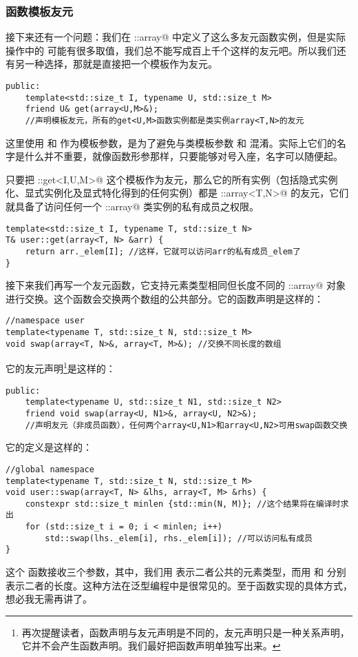 \subsubsection*{函数模板友元}
接下来还有一个问题：我们在 \lstinline@user::array@ 中定义了这么多友元函数实例，但是实际操作中的 \lstinline@I@ 可能有很多取值，我们总不能写成百上千个这样的友元吧。所以我们还有另一种选择，那就是直接把一个模板作为友元。
\begin{lstlisting}
public:
    template<std::size_t I, typename U, std::size_t M>
    friend U& get(array<U,M>&);
    //声明模板友元，所有的get<U,M>函数实例都是类实例array<T,N>的友元
\end{lstlisting}
这里使用 \lstinline@U@ 和 \lstinline@M@ 作为模板参数，是为了避免与类模板参数 \lstinline@T@ 和 \lstinline@N@ 混淆。实际上它们的名字是什么并不重要，就像函数形参那样，只要能够对号入座，名字可以随便起。\par
只要把 \lstinline@user::get<I,U,M>@ 这个模板作为友元，那么它的所有实例（包括隐式实例化、显式实例化及显式特化得到的任何实例）都是 \lstinline@user::array<T,N>@ 的友元，它们就具备了访问任何一个 \lstinline@user::array@ 类实例的私有成员之权限。
\begin{lstlisting}
template<std::size_t I, typename T, std::size_t N>
T& user::get(array<T, N> &arr) {
    return arr._elem[I]; //这样，它就可以访问arr的私有成员_elem了
}
\end{lstlisting}\par
接下来我们再写一个友元函数，它支持元素类型相同但长度不同的 \lstinline@user::array@ 对象进行交换。这个函数会交换两个数组的公共部分。它的函数声明是这样的：
\begin{lstlisting}
//namespace user
template<typename T, std::size_t N, std::size_t M>
void swap(array<T, N>&, array<T, M>&); //交换不同长度的数组
\end{lstlisting}
它的友元声明\footnote{再次提醒读者，函数声明与友元声明是不同的，友元声明只是一种关系声明，它并不会产生函数声明。我们最好把函数声明单独写出来。}是这样的：
\begin{lstlisting}
public:
    template<typename U, std::size_t N1, std::size_t N2>
    friend void swap(array<U, N1>&, array<U, N2>&);
    //声明友元（非成员函数），任何两个array<U,N1>和array<U,N2>可用swap函数交换
\end{lstlisting}
它的定义是这样的：
\begin{lstlisting}
//global namespace
template<typename T, std::size_t N, std::size_t M>
void user::swap(array<T, N> &lhs, array<T, M> &rhs) {
    constexpr std::size_t minlen {std::min(N, M)}; //这个结果将在编译时求出
    for (std::size_t i = 0; i < minlen; i++)
        std::swap(lhs._elem[i], rhs._elem[i]); //可以访问私有成员
}
\end{lstlisting}
这个 \lstinline@swap@ 函数接收三个参数，其中，我们用 \lstinline@T@ 表示二者公共的元素类型，而用 \lstinline@N@ 和 \lstinline@M@ 分别表示二者的长度。这种方法在泛型编程中是很常见的。至于函数实现的具体方式，想必我无需再讲了。\par
